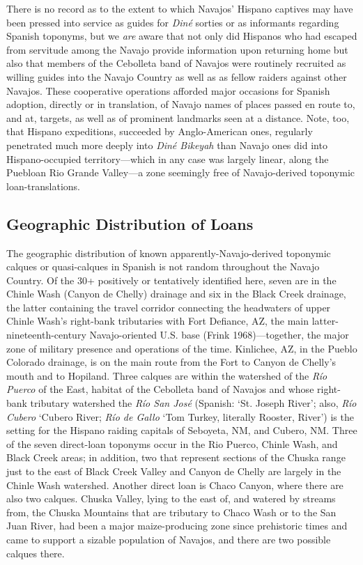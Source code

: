 There is no record as to the extent to which Navajos’ Hispano captives may have been pressed into service as guides for \textit{Diné} sorties or as informants regarding Spanish toponyms, but we \textit{are} aware that not only did Hispanos who had escaped from servitude among the Navajo provide information upon returning home but also that members of the Cebolleta band of Navajos were routinely recruited as willing guides into the Navajo Country as well as as fellow raiders against other Navajos.  These cooperative operations afforded major occasions for Spanish adoption, directly or in translation, of Navajo names of places passed en route to, and at, targets, as well as of prominent landmarks seen at a distance.  Note, too, that Hispano expeditions, succeeded by Anglo-American ones, regularly penetrated much more deeply into \textit{Diné Bikeyah} than Navajo ones did into Hispano-occupied territory—which in any case was largely linear, along the Puebloan Rio Grande Valley—a zone seemingly free of Navajo-derived toponymic loan-translations.

\subsection{Geographic Distribution of Loans}
The geographic distribution of known apparently-Navajo-derived toponymic calques or quasi-calques in Spanish is not random throughout the Navajo Country.  Of the 30+ positively or tentatively identified here, seven are in the Chinle Wash (Canyon de Chelly) drainage and six in the Black Creek drainage, the latter containing the travel corridor connecting the headwaters of upper Chinle Wash’s right-bank tributaries with Fort Defiance, AZ, the main latter-nineteenth-century Navajo-oriented U.S. base (Frink 1968)—together, the major zone of military presence and operations of the time.  Kinlichee, AZ, in the Pueblo Colorado drainage, is on the main route from the Fort to Canyon de Chelly’s mouth and to Hopiland.  Three calques are within the watershed of the \textit{Río Puerco} of the East, habitat of the Cebolleta band of Navajos and whose right-bank tributary watershed the \textit{Río San José} (Spanish: ‘St. Joseph River’; also, \textit{Río Cubero} ‘Cubero River; \textit{Río de Gallo} ‘Tom Turkey, literally Rooster, River’) is the setting for the Hispano raiding capitals of Seboyeta, NM, and Cubero, NM.  Three of the seven direct-loan toponyms occur in the Rio Puerco, Chinle Wash, and Black Creek areas; in addition, two that represent sections of the Chuska range just to the east of Black Creek Valley and Canyon de Chelly are largely in the Chinle Wash watershed.  Another direct loan is Chaco Canyon, where there are also two calques.  Chuska Valley, lying to the east of, and watered by streams from, the Chuska Mountains that are tributary to Chaco Wash or to the San Juan River, had been a major maize-producing zone since prehistoric times and came to support a sizable population of Navajos, and there are two possible calques there.

